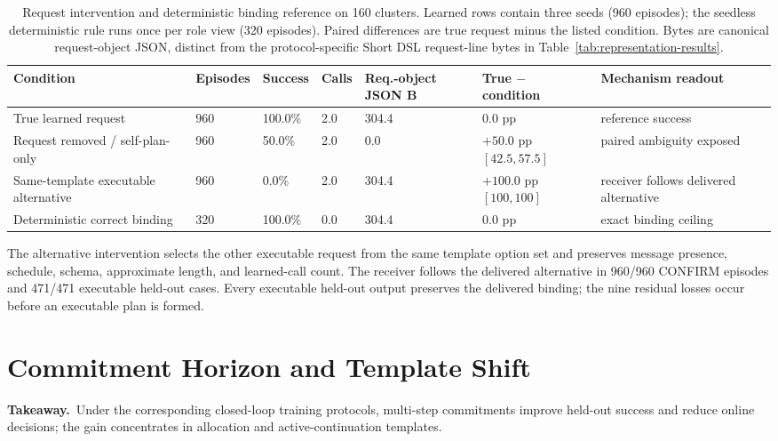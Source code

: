 \documentclass[10pt]{article}
\newcommand{\tabstyle}{\small\setlength{\tabcolsep}{2.5pt}\renewcommand{\arraystretch}{1.10}}
\newcommand{\widetabstyle}{\tabstyle}
\newcommand{\thead}[1]{\textbf{#1}}
\newcommand{\takeaway}[1]{\par\smallskip\noindent\textcolor{GCNavy}{\textbf{Takeaway.}}~#1\par\smallskip}
\begin{document}
\begin{table}[!htbp]
  \centering
  \caption{Request intervention and deterministic binding reference on 160 clusters. Learned rows contain three seeds (960 episodes); the seedless deterministic rule runs once per role view (320 episodes). Paired differences are true request minus the listed condition. Bytes are canonical request-object JSON, distinct from the protocol-specific Short DSL request-line bytes in Table~\ref{tab:representation-results}.}
  \label{tab:request-intervention}
  \widetabstyle
  \begin{tabularx}{\textwidth}{L{2.7cm} R{1.45cm} R{1.25cm} R{0.9cm} R{1.1cm} R{1.45cm} Z}
    \toprule
    \thead{Condition} & \thead{Episodes} & \thead{Success} & \thead{Calls} & \thead{Req.-object JSON B} & \thead{True $-$ condition} & \thead{Mechanism readout} \\
    \midrule
    True learned request & 960 & 100.0\% & 2.0 & 304.4 & 0.0 pp & reference success \\
    Request removed / self-plan-only & 960 & 50.0\% & 2.0 & 0.0 & $+50.0$ pp $[42.5,57.5]$ & paired ambiguity exposed \\
    Same-template executable alternative & 960 & 0.0\% & 2.0 & 304.4 & $+100.0$ pp $[100,100]$ & receiver follows delivered alternative \\
    Deterministic correct binding & 320 & 100.0\% & 0.0 & 304.4 & $0.0$ pp & exact binding ceiling \\
    \bottomrule
  \end{tabularx}
\end{table}

The alternative intervention selects the other executable request from the same template option set and preserves message presence, schedule, schema, approximate length, and learned-call count. The receiver follows the delivered alternative in 960/960 CONFIRM episodes and 471/471 executable held-out cases. Every executable held-out output preserves the delivered binding; the nine residual losses occur before an executable plan is formed.


\section{Commitment Horizon and Template Shift}
\label{sec:supp-horizon}

\takeaway{Under the corresponding closed-loop training protocols, multi-step commitments improve held-out success and reduce online decisions; the gain concentrates in allocation and active-continuation templates.}
\end{document}
